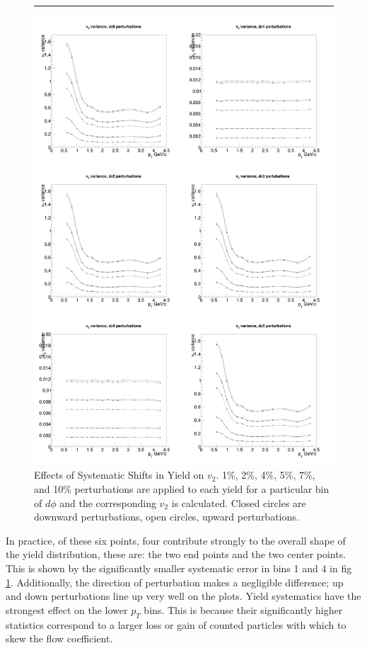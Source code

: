 \begin{figure}[p]
\captionsetup{width=1.2\linewidth}
    \caption[Effects of Systematic Shifts in Yield on $v_2$.]{Effects of Systematic Shifts in Yield on $v_2$. 1\%, 2\%, 4\%, 5\%, 7\%, and 10\% perturbations are applied to each yield for a particular bin of $d\phi$ and the corresponding $v_2$ is calculated. Closed circles are downward perturbations, open circles, upward perturbations.}
    \rule{35em}{0.5pt}
    \centerline{\includegraphics[width=1\textwidth]{evtQA/plusminusstudy.jpg}}
    \label{fig:wiggleupdown}
\end{figure}

In practice, of these six points, four contribute strongly to the overall shape of the yield distribution, these are: the two end points and the two center points. This is shown by the significantly smaller systematic error in bins 1 and 4 in fig \ref{fig:wiggleupdown}. Additionally, the direction of perturbation makes a negligible difference; up and down perturbations line up very well on the plots. Yield systematics have the strongest effect on the lower $p_T$ bins. This is because their significantly higher statistics correspond to a larger loss or gain of counted particles with which to skew the flow coefficient.

